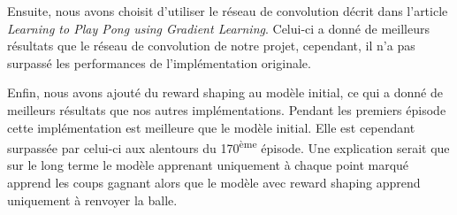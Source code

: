 \par Ensuite, nous avons choisit d'utiliser le réseau de convolution 
décrit dans l'article \emph{Learning to Play Pong using Gradient Learning}\cite{PongPolicyGradient}.
Celui-ci a donné de meilleurs résultats que le réseau de convolution de notre projet, cependant, il n'a pas surpassé 
les performances de l'implémentation originale.

\par Enfin, nous avons ajouté du reward shaping au modèle initial, ce qui a donné de meilleurs résultats que nos autres 
implémentations. Pendant les premiers épisode cette implémentation est meilleure que le modèle initial.
Elle est cependant surpassée par celui-ci aux alentours du 170\textsuperscript{ème} épisode.
Une explication serait que sur le long terme le modèle apprenant uniquement à chaque point marqué
apprend les coups gagnant alors que le modèle avec reward shaping apprend uniquement à renvoyer la balle.
